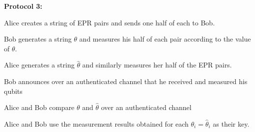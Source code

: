 \begin{exercises}
\begin{protocolEnumerate}
\end{protocolEnumerate}
{\bf Protocol 3:}
\begin{protocolEnumerate}
\item Alice creates a string of EPR pairs and sends one half of each to Bob.
\item Bob generates a string $\theta$ and measures his half of each pair according to the value of $\theta$.
\item Alice generates a string $\hat{\theta}$ and similarly measures her half of the EPR pairs.
\item Bob announces over an authenticated channel that he received and measured his qubits
\item Alice and Bob compare $\theta$ and $\hat{\theta}$ over an authenticated channel
\item Alice and Bob use the measurement results obtained for each $\theta_i = \hat{\theta}_i $ as their key.
\end{protocolEnumerate}

\end{exercises}
